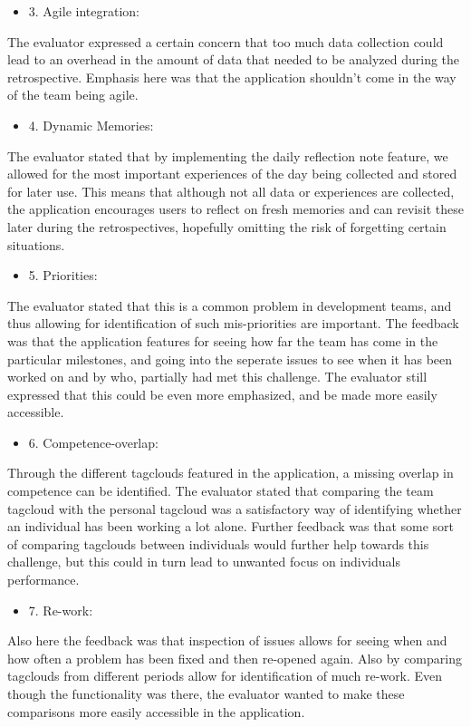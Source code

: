 \begin{itemize}
    \item 3. Agile integration: 
\end{itemize}
The evaluator expressed a certain concern that too much data collection could lead to an overhead in the amount of data that needed to be analyzed during the retrospective. Emphasis here was that the application shouldn't come in the way of the team being agile. 

\begin{itemize}
    \item 4. Dynamic Memories:
\end{itemize}
 The evaluator stated that by implementing the daily reflection note feature, we allowed for the most important experiences of the day being collected and stored for later use. This means that although not all data or experiences are collected, the application encourages users to reflect on fresh memories and can revisit these later during the retrospectives, hopefully omitting the risk of forgetting certain situations. 

\begin{itemize}
    \item 5. Priorities: 
\end{itemize}
The evaluator stated that this is a common problem in development teams, and thus allowing for identification of such mis-priorities are important. The feedback was that the application features for seeing how far the team has come in the particular milestones, and going into the seperate issues to see when it has been worked on and by who, partially had met this challenge. The evaluator still expressed that this could be even more emphasized, and be made more easily accessible. 

\begin{itemize}
    \item 6. Competence-overlap:  
\end{itemize}
Through the different tagclouds featured in the application, a missing overlap in competence can be identified. The evaluator stated that comparing the team tagcloud with the personal tagcloud was a satisfactory way of identifying whether an individual has been working a lot alone. Further feedback was that some sort of comparing tagclouds between individuals would further help towards this challenge, but this could in turn lead to unwanted focus on individuals performance.

\begin{itemize}
    \item 7. Re-work: 
\end{itemize}
 Also here the feedback was that inspection of issues allows for seeing when and how often a problem has been fixed and then re-opened again. Also by comparing tagclouds from different periods allow for identification of much re-work. Even though the functionality was there, the evaluator wanted to make these comparisons more easily accessible in the application.

